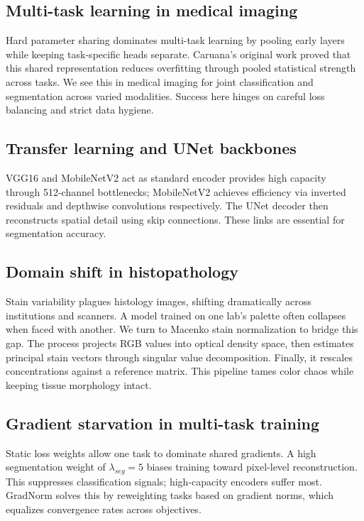 \documentclass[conference,a4paper]{IEEEtran}
\begin{document}
\subsection{Multi-task learning in medical imaging}
Hard parameter sharing dominates multi-task learning by pooling early layers while keeping task-specific heads separate. Caruana’s original work proved that this shared representation reduces overfitting through pooled statistical strength across tasks. We see this in medical imaging for joint classification and segmentation across varied modalities. Success here hinges on careful loss balancing and strict data hygiene.

\subsection{Transfer learning and UNet backbones}
VGG16 and MobileNetV2 act as standard encoder provides high capacity through 512-channel bottlenecks; MobileNetV2 achieves efficiency via inverted residuals and depthwise convolutions respectively. The UNet decoder then reconstructs spatial detail using skip connections. These links are essential for segmentation accuracy.

\subsection{Domain shift in histopathology}
Stain variability plagues histology images, shifting dramatically across institutions and scanners. A model trained on one lab’s palette often collapses when faced with another. We turn to Macenko stain normalization to bridge this gap. The process projects RGB values into optical density space, then estimates principal stain vectors through singular value decomposition. Finally, it rescales concentrations against a reference matrix. This pipeline tames color chaos while keeping tissue morphology intact.

\subsection{Gradient starvation in multi-task training}
Static loss weights allow one task to dominate shared gradients. A high segmentation weight of $\lambda_{seg}=5$ biases training toward pixel-level reconstruction. This suppresses classification signals; high-capacity encoders suffer most. GradNorm solves this by reweighting tasks based on gradient norms, which equalizes convergence rates across objectives.
\end{document}
